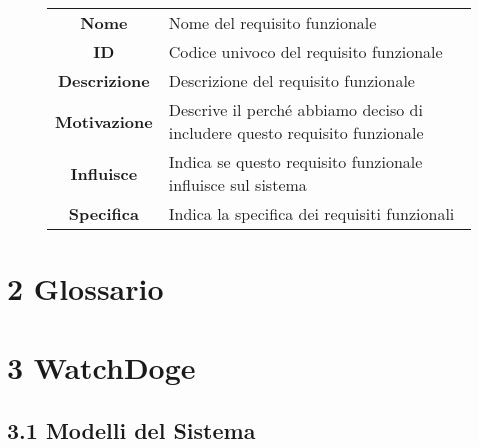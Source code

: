 \documentclass[]{article}
\begin{document}
\begin{figure}[htbp]
\centering
\begin{tabular}{|c|l|}
\hline

\textbf{Nome}
 & 
Nome del requisito funzionale
\\

\textbf{ID}
 & 
Codice univoco del requisito funzionale
\\

\textbf{Descrizione}
 & 
Descrizione del requisito funzionale
\\

\textbf{Motivazione}
 & 
Descrive il perché abbiamo deciso di includere questo requisito
funzionale
\\

\textbf{Influisce}
 & 
Indica se questo requisito funzionale influisce sul sistema
\\

\textbf{Specifica}
 & 
Indica la specifica dei requisiti funzionali
\\
\hline
\end{tabular}
\end{figure}

\hypertarget{glossario}{%
\section{2 Glossario}\label{glossario}}

\hypertarget{watchdoge-1}{%
\section{3 WatchDoge}\label{watchdoge-1}}

\hypertarget{modelli-del-sistema}{%
\subsection{3.1 Modelli del Sistema}\label{modelli-del-sistema}}
\end{document}
